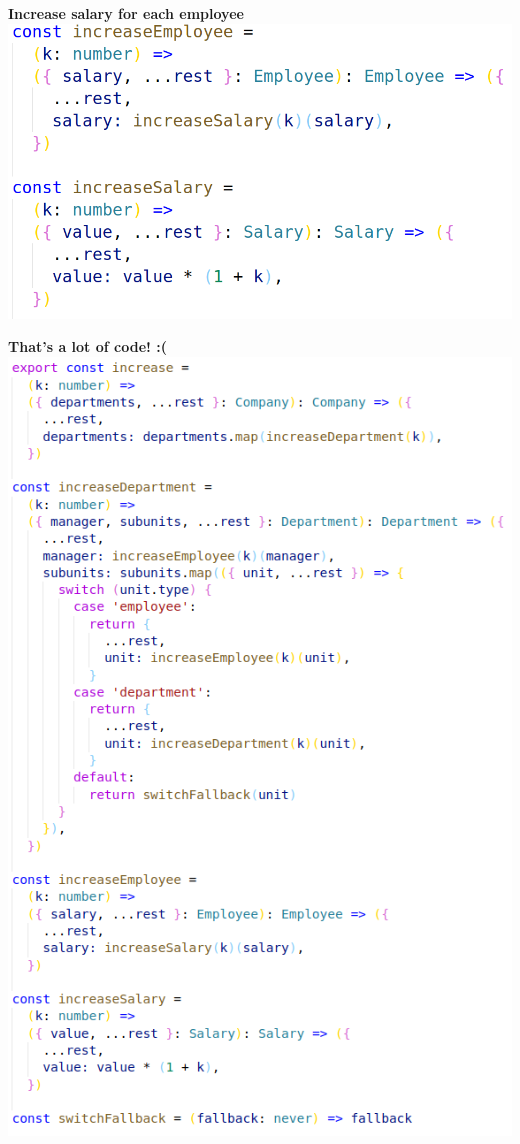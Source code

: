 \documentclass[14pt]{beamer}
\begin{document}
\begin{frame}
  \textbf{Increase salary for each employee}
  \vfill
  \includegraphics[height=0.9\textheight,width=\textwidth,keepaspectratio]{graphics/increase-naive-step3-ts.png}
\end{frame}

\begin{frame}
  \textbf{That's a lot of code! :(}
  \vfill
  \includegraphics[height=0.8\textheight,width=\textwidth,keepaspectratio]{graphics/increase-naive-ts.png}
\end{frame}
\end{document}
